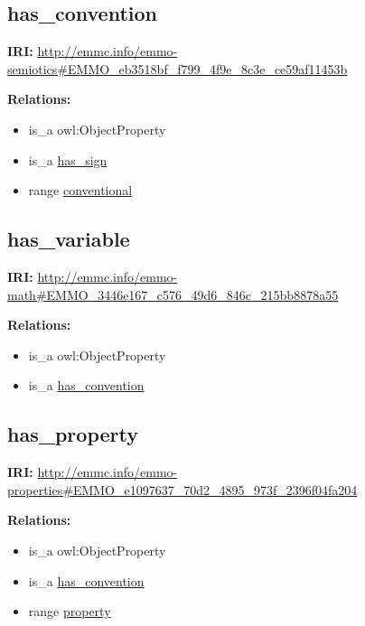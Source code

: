 \documentclass[a4paper,]{report}
\providecommand{\tightlist}{%
  \setlength{\itemsep}{0pt}\setlength{\parskip}{0pt}}
\begin{document}
\hypertarget{has_convention-1}{%
\subsection{has\_convention}\label{has_convention-1}}

\textbf{IRI:}
\url{http://emmc.info/emmo-semiotics\#EMMO_eb3518bf_f799_4f9e_8c3e_ce59af11453b}

\textbf{Relations:}

\begin{itemize}
\tightlist
\item
  is\_a owl:ObjectProperty
\item
  is\_a \protect\hyperlink{has_sign}{has\_sign}
\item
  range \protect\hyperlink{conventional}{conventional}
\end{itemize}

\hypertarget{has_variable-1}{%
\subsection{has\_variable}\label{has_variable-1}}

\textbf{IRI:}
\url{http://emmc.info/emmo-math\#EMMO_3446e167_c576_49d6_846c_215bb8878a55}

\textbf{Relations:}

\begin{itemize}
\tightlist
\item
  is\_a owl:ObjectProperty
\item
  is\_a \protect\hyperlink{has_convention}{has\_convention}
\end{itemize}

\hypertarget{has_property-1}{%
\subsection{has\_property}\label{has_property-1}}

\textbf{IRI:}
\url{http://emmc.info/emmo-properties\#EMMO_e1097637_70d2_4895_973f_2396f04fa204}

\textbf{Relations:}

\begin{itemize}
\tightlist
\item
  is\_a owl:ObjectProperty
\item
  is\_a \protect\hyperlink{has_convention}{has\_convention}
\item
  range \protect\hyperlink{property}{property}
\end{itemize}
\end{document}
